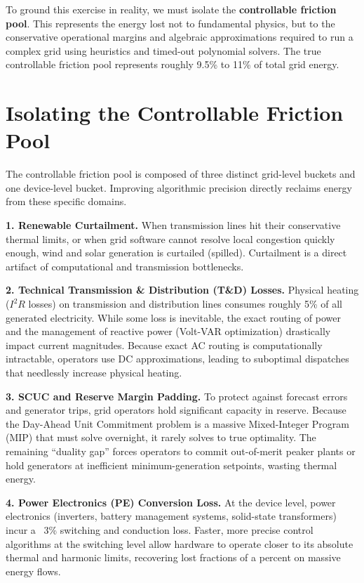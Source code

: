 \documentclass[11pt, a4paper]{article}
\newcommand{\para}[1]{\par\medskip\noindent\textbf{#1}\quad}
\begin{document}
To ground this exercise in reality, we must isolate the \textbf{controllable friction pool}. This represents the energy lost not to fundamental physics, but to the conservative operational margins and algebraic approximations required to run a complex grid using heuristics and timed-out polynomial solvers. The true controllable friction pool represents roughly 9.5\% to 11\% of total grid energy.

\section{Isolating the Controllable Friction Pool}

The controllable friction pool is composed of three distinct grid-level buckets and one device-level bucket. Improving algorithmic precision directly reclaims energy from these specific domains.

\para{1. Renewable Curtailment.} When transmission lines hit their conservative thermal limits, or when grid software cannot resolve local congestion quickly enough, wind and solar generation is curtailed (spilled). Curtailment is a direct artifact of computational and transmission bottlenecks.

\para{2. Technical Transmission \& Distribution (T\&D) Losses.} Physical heating ($I^2R$ losses) on transmission and distribution lines consumes roughly 5\% of all generated electricity. While some loss is inevitable, the exact routing of power and the management of reactive power (Volt-VAR optimization) drastically impact current magnitudes. Because exact AC routing is computationally intractable, operators use DC approximations, leading to suboptimal dispatches that needlessly increase physical heating.

\para{3. SCUC and Reserve Margin Padding.} To protect against forecast errors and generator trips, grid operators hold significant capacity in reserve. Because the Day-Ahead Unit Commitment problem is a massive Mixed-Integer Program (MIP) that must solve overnight, it rarely solves to true optimality. The remaining ``duality gap'' forces operators to commit out-of-merit peaker plants or hold generators at inefficient minimum-generation setpoints, wasting thermal energy.

\para{4. Power Electronics (PE) Conversion Loss.} At the device level, power electronics (inverters, battery management systems, solid-state transformers) incur a ~3\% switching and conduction loss. Faster, more precise control algorithms at the switching level allow hardware to operate closer to its absolute thermal and harmonic limits, recovering lost fractions of a percent on massive energy flows.
\end{document}
